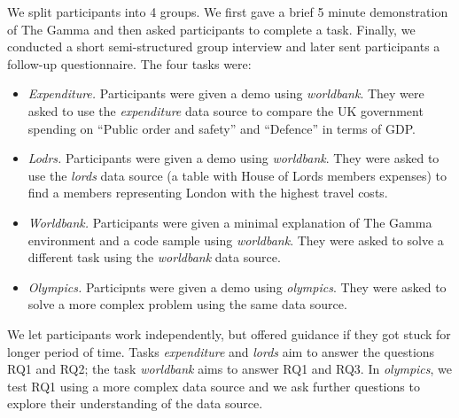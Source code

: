 \documentclass{sigchi}
\begin{document}
We split participants into 4 groups. We first gave a brief 5 minute demonstration of The
Gamma and then asked participants to complete a task. Finally, we conducted a short semi-structured
group interview and later sent participants a follow-up questionnaire. The four tasks were:

\begin{itemize}
\item \emph{Expenditure.} Participants were given a demo using \emph{worldbank}.
  They were asked to use the \emph{expenditure} data source to compare the UK government spending
  on ``Public order and safety'' and ``Defence'' in terms of GDP.
\item \emph{Lodrs.} Participants were given a demo using \emph{worldbank}.
  They were asked to use the \emph{lords} data source (a table with House of Lords
  members expenses) to find a members representing London with the highest travel costs.
\item \emph{Worldbank.} Participants were given a minimal explanation of The Gamma environment and
  a code sample using \emph{worldbank}. They were asked to solve a different task using
  the \emph{worldbank} data source.
\item \emph{Olympics.} Participnts were given a demo using \emph{olympics}.
  They were asked to solve a more complex problem using the same data source.
\end{itemize}

We let participants work independently, but offered guidance if they got stuck for longer period of
time. Tasks \emph{expenditure} and \emph{lords} aim to answer the questions RQ1 and RQ2; the task
\emph{worldbank} aims to answer RQ1 and RQ3. In \emph{olympics}, we test RQ1 using a more complex
data source and we ask further questions to explore their understanding of the data source.
\end{document}
